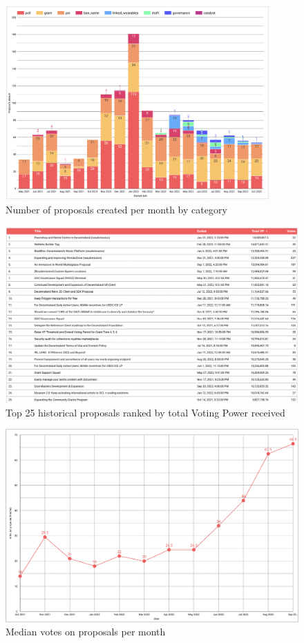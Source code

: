 \documentclass[MSE,Master,english]{twbook}%
\begin{document}
\begin{figure}[H]
  \centering
  \includegraphics[width=0.90\textwidth]{metrics/proposals_by_month.png}
  \caption{Number of proposals created per month by category}
  \label{fig:proposals_by_month}
\end{figure}
\begin{figure}[H]
  \centering
  \includegraphics[width=\textwidth]{metrics/top_proposals.png}
  \caption{Top 25 historical proposals ranked by total Voting Power received}
  \label{fig:top_proposals}
\end{figure}
\begin{figure}[H]
  \centering
  \includegraphics[width=\textwidth]{metrics/median_votes.png}
  \caption{Median votes on proposals per month}
  \label{fig:median_votes}
\end{figure}
\end{document}
